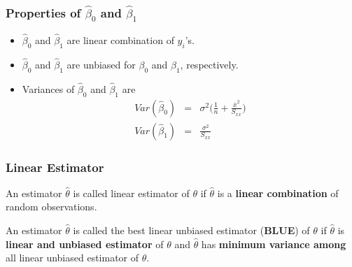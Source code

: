 \documentclass[10pt]{beamer} %
\begin{document}
\begin{frame}
   \frametitle{Properties of $\hat\beta_0$ and $\hat\beta_1$ }
   \begin{itemize}
      \item $\hat\beta_0$ and $\hat\beta_1$ are linear combination of $y_i$'s. 
         \vspace{0.5cm}	

      \item $\hat\beta_0$ and $\hat\beta_1$ are unbiased for $\beta_0$ and $\beta_1$, respectively. 
         \vspace{0.5cm}	

      \item Variances of $\hat\beta_0$ and $\hat\beta_1$ are 
         \begin{eqnarray*}
            Var(\hat\beta_0) &=& \sigma^2\Big(\frac{1}{n}+\frac{\bar x^2}{S_{xx}}\Big) \\
            Var(\hat\beta_1) &=& \frac{\sigma^2}{S_{xx}}
         \end{eqnarray*}
   \end{itemize}
\end{frame}

%

\begin{frame}
   \frametitle{Linear Estimator }
   \begin{defn}
      An estimator $\hat\theta$ is called linear estimator of $\theta$ if
      $\hat\theta$ is a \textbf{linear combination} of random observations. 
   \end{defn}
   \vspace{0.5cm}

   \begin{defn}
      An estimator $\hat\theta$ is called the best linear unbiased estimator
      (\textbf{BLUE}) of $\theta$ if $\hat\theta$ is \textbf{linear and unbiased
      estimator} of $\theta$ and $\hat\theta$ has \textbf{minimum variance
      among} all linear unbiased estimator of $\theta$. 
   \end{defn}

\end{frame}
\end{document}
